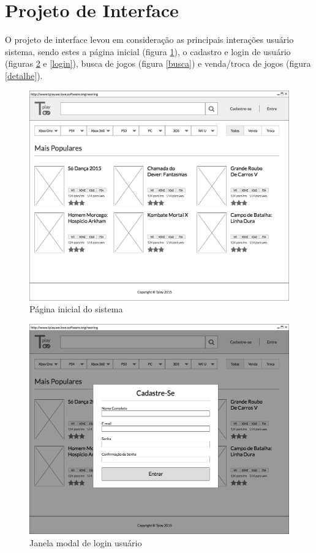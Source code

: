\documentclass[a4paper,11pt]{article}
\begin{document}
\section{Projeto de Interface}

O projeto de interface levou em consideração as principais interações usuário sistema, sendo estes a página inicial (figura \ref{home}), o cadastro e login de usuário (figuras \ref{cadastro} e \ref{login}), busca de jogos (figura \ref{busca}) e venda/troca de jogos (figura \ref{detalhe}).

\begin{figure}[!H]
    		\centering
        	\includegraphics[width=\textwidth,height=\dimexpr\textheight-3\baselineskip\relax,keepaspectratio]{Home.png}
        	\caption{Página inicial do sistema}
     		\label{home}
\end{figure}

\begin{figure}[!H]
    		\centering
        	\includegraphics[width=\textwidth,height=\dimexpr\textheight-3\baselineskip\relax,keepaspectratio]{Cadastro.png}
        	\caption{Janela modal de login usuário}
     		\label{cadastro}
\end{figure}
\end{document}
